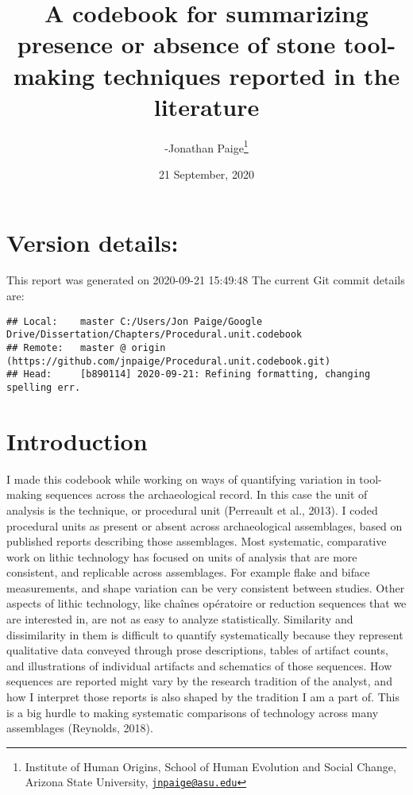 \documentclass[
]{article}
\title{A codebook for summarizing presence or absence of stone tool-making
techniques reported in the literature}
\author{-Jonathan Paige\footnote{Institute of Human Origins, School of Human
  Evolution and Social Change, Arizona State University,
  \href{mailto:jnpaige@asu.edu}{\nolinkurl{jnpaige@asu.edu}}}}
\date{21 September, 2020}
\begin{document}
\maketitle

{
\setcounter{tocdepth}{3}
\tableofcontents
}
\hypertarget{version-details}{%
\section{Version details:}\label{version-details}}

This report was generated on 2020-09-21 15:49:48 The current Git commit
details are:

\begin{verbatim}
## Local:    master C:/Users/Jon Paige/Google Drive/Dissertation/Chapters/Procedural.unit.codebook
## Remote:   master @ origin (https://github.com/jnpaige/Procedural.unit.codebook.git)
## Head:     [b890114] 2020-09-21: Refining formatting, changing spelling err.
\end{verbatim}

\hypertarget{introduction}{%
\section{Introduction}\label{introduction}}

I made this codebook while working on ways of quantifying variation in
tool-making sequences across the archaeological record. In this case the
unit of analysis is the technique, or procedural unit (Perreault et al.,
2013). I coded procedural units as present or absent across
archaeological assemblages, based on published reports describing those
assemblages. Most systematic, comparative work on lithic technology has
focused on units of analysis that are more consistent, and replicable
across assemblages. For example flake and biface measurements, and shape
variation can be very consistent between studies. Other aspects of
lithic technology, like chaînes opératoire or reduction sequences that
we are interested in, are not as easy to analyze statistically.
Similarity and dissimilarity in them is difficult to quantify
systematically because they represent qualitative data conveyed through
prose descriptions, tables of artifact counts, and illustrations of
individual artifacts and schematics of those sequences. How sequences
are reported might vary by the research tradition of the analyst, and
how I interpret those reports is also shaped by the tradition I am a
part of. This is a big hurdle to making systematic comparisons of
technology across many assemblages (Reynolds, 2018).
\end{document}
